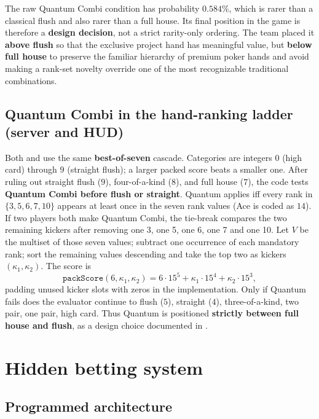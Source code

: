 \documentclass[11pt,a4paper]{article}
\begin{document}
The raw Quantum Combi condition has probability $0.584\%$, which is rarer than a classical flush and also rarer than a full house. Its final position in the game is therefore a \textbf{design decision}, not a strict rarity-only ordering. The team placed it \textbf{above flush} so that the exclusive project hand has meaningful value, but \textbf{below full house} to preserve the familiar hierarchy of premium poker hands and avoid making a rank-set novelty override one of the most recognizable traditional combinations.

\subsection{Quantum Combi in the hand-ranking ladder (server and HUD)}

Both  and  use the same \textbf{best-of-seven} cascade. Categories are integers $0$ (high card) through $9$ (straight flush); a larger packed score beats a smaller one. After ruling out straight flush ($9$), four-of-a-kind ($8$), and full house ($7$), the code tests \textbf{Quantum Combi before flush or straight}. Quantum applies iff every rank in $\{3,5,6,7,10\}$ appears at least once in the seven rank values (Ace is coded as $14$). If two players both make Quantum Combi, the tie-break compares the two remaining kickers after removing one 3, one 5, one 6, one 7 and one 10. Let $V$ be the multiset of those seven values; subtract one occurrence of each mandatory rank; sort the remaining values descending and take the top two as kickers $(\kappa_1,\kappa_2)$. The score is
\[
\texttt{packScore}(6,\kappa_1,\kappa_2) = 6\cdot 15^{5} + \kappa_1\cdot 15^{4} + \kappa_2\cdot 15^{3},
\]
padding unused kicker slots with zeros in the implementation. Only if Quantum fails does the evaluator continue to flush ($5$), straight ($4$), three-of-a-kind, two pair, one pair, high card. Thus Quantum is positioned \textbf{strictly between full house and flush}, as a design choice documented in .

\section{Hidden betting system}
\label{app:hidden}

\subsection{Programmed architecture}
\end{document}
